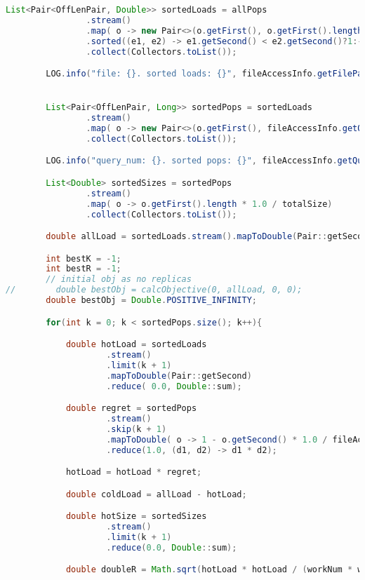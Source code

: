 \begin{Appendix}
\begin{lstlisting}[language=java]
        List<Pair<OffLenPair, Double>> sortedLoads = allPops
                .stream()
                .map( o -> new Pair<>(o.getFirst(), o.getFirst().length * o.getSecond() * 1.0 / totalSize))
                .sorted((e1, e2) -> e1.getSecond() < e2.getSecond()?1:-1)
                .collect(Collectors.toList());

        LOG.info("file: {}. sorted loads: {}", fileAccessInfo.getFilePath().getPath(), sortedLoads);


        List<Pair<OffLenPair, Long>> sortedPops = sortedLoads
                .stream()
                .map( o -> new Pair<>(o.getFirst(), fileAccessInfo.getOffsetCount().get(o.getFirst())))
                .collect(Collectors.toList());

        LOG.info("query_num: {}. sorted pops: {}", fileAccessInfo.getQueryNum(), sortedPops);

        List<Double> sortedSizes = sortedPops
                .stream()
                .map( o -> o.getFirst().length * 1.0 / totalSize)
                .collect(Collectors.toList());

        double allLoad = sortedLoads.stream().mapToDouble(Pair::getSecond).reduce(0.0, Double::sum);

        int bestK = -1;
        int bestR = -1;
        // initial obj as no replicas
//        double bestObj = calcObjective(0, allLoad, 0, 0);
        double bestObj = Double.POSITIVE_INFINITY;

        for(int k = 0; k < sortedPops.size(); k++){

            double hotLoad = sortedLoads
                    .stream()
                    .limit(k + 1)
                    .mapToDouble(Pair::getSecond)
                    .reduce( 0.0, Double::sum);

            double regret = sortedPops
                    .stream()
                    .skip(k + 1)
                    .mapToDouble( o -> 1 - o.getSecond() * 1.0 / fileAccessInfo.getQueryNum())
                    .reduce(1.0, (d1, d2) -> d1 * d2);

            hotLoad = hotLoad * regret;

            double coldLoad = allLoad - hotLoad;

            double hotSize = sortedSizes
                    .stream()
                    .limit(k + 1)
                    .reduce(0.0, Double::sum);

            double doubleR = Math.sqrt(hotLoad * hotLoad / (workNum * weight * hotSize));


\end{lstlisting}
\end{Appendix}
